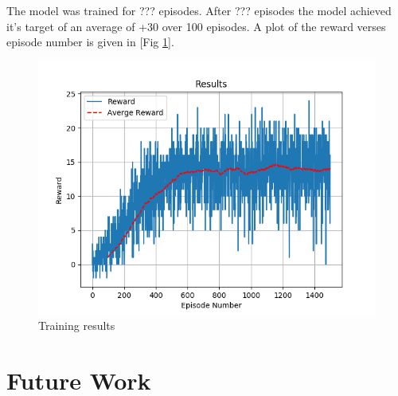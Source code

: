 \documentclass[12pt]{article}
\begin{document}
The model was trained for ??? episodes. 
After ??? episodes the model achieved it's target of an average of +30 over 100 episodes.
A plot of the reward verses episode number is given in [Fig \ref{results}].

\begin{figure}
	\centering
	\includegraphics[width=0.8\linewidth]{./img/Results.png}
	\caption{Training results}
	\label{results}
\end{figure}



\section{Future Work}

\printbibliography
\end{document}
